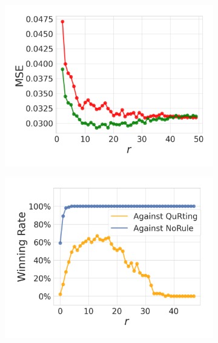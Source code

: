 \documentclass{article}
\begin{document}
\begin{figure}[H]
\begin{subfigure}{0.3\textwidth}
  \centering
  \includegraphics[width=1.0\linewidth]{figures/EvalA_IMDB_Single_dpp_vs_random_MSE.pdf}
  \caption{}
  \label{fig:EvalA_IMDB_Single_dpp_vs_random_MSE}
\end{subfigure}
\begin{subfigure}{0.3\textwidth}
  \centering
  \includegraphics[width=1.0\linewidth]{figures/EvalA_CommonCrawl_Single_winning_rate.pdf}
  \caption{}
  \label{fig:EvalA_CommonCrawl_Single_winning_rate}
\end{subfigure}
\begin{subfigure}{0.297\textwidth}
  \centering

\end{subfigure}
\end{figure}
\end{document}
